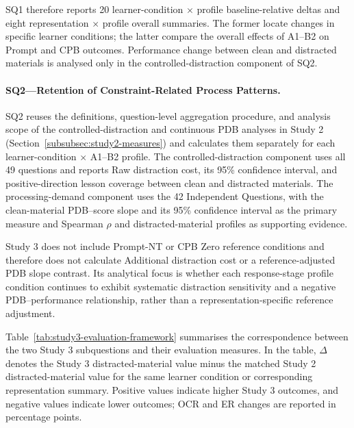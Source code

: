 SQ1 therefore reports 20 learner-condition $\times$ profile baseline-relative deltas and eight representation $\times$ profile overall summaries. The former locate changes in specific learner conditions; the latter compare the overall effects of A1--B2 on Prompt and CPB outcomes. Performance change between clean and distracted materials is analysed only in the controlled-distraction component of SQ2.

\paragraph{SQ2---Retention of Constraint-Related Process Patterns.}

SQ2 reuses the definitions, question-level aggregation procedure, and analysis scope of the controlled-distraction and continuous PDB analyses in Study 2 (Section~\ref{subsubsec:study2-measures}) and calculates them separately for each learner-condition $\times$ A1--B2 profile. The controlled-distraction component uses all 49 questions and reports Raw distraction cost, its 95\% confidence interval, and positive-direction lesson coverage between clean and distracted materials. The processing-demand component uses the 42 Independent Questions, with the clean-material PDB--score slope and its 95\% confidence interval as the primary measure and Spearman $\rho$ and distracted-material profiles as supporting evidence.

Study 3 does not include Prompt-NT or CPB Zero reference conditions and therefore does not calculate Additional distraction cost or a reference-adjusted PDB slope contrast. Its analytical focus is whether each response-stage profile condition continues to exhibit systematic distraction sensitivity and a negative PDB--performance relationship, rather than a representation-specific reference adjustment.

Table~\ref{tab:study3-evaluation-framework} summarises the correspondence between the two Study 3 subquestions and their evaluation measures. In the table, $\Delta$ denotes the Study 3 distracted-material value minus the matched Study 2 distracted-material value for the same learner condition or corresponding representation summary. Positive values indicate higher Study 3 outcomes, and negative values indicate lower outcomes; OCR and ER changes are reported in percentage points.

